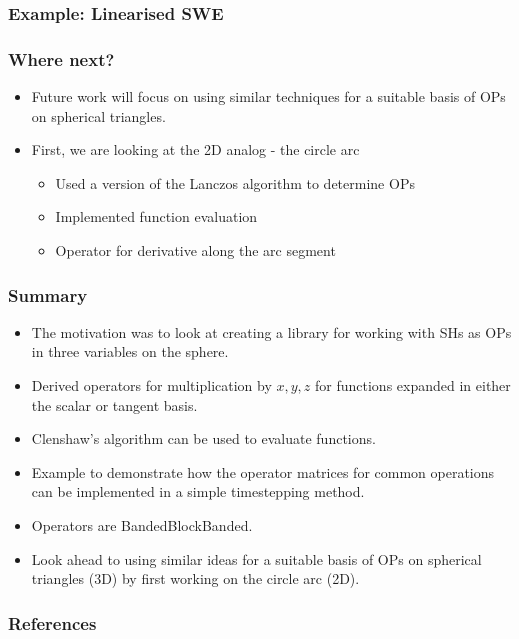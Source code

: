 \documentclass[10pt]{beamer}
\begin{document}
\frame
{
    \frametitle{Example: Linearised SWE}


}

\frame
{
    \frametitle{Where next?}

\begin{itemize}

\item Future work will focus on using similar techniques for a suitable basis of OPs on spherical triangles.

\item First, we are looking at the 2D analog - the circle arc

\begin{itemize}
	\item Used a version of the Lanczos algorithm to determine OPs
	\item Implemented function evaluation
	\item Operator for derivative along the arc segment
\end{itemize}

\end{itemize}
   
}

\frame
{
    \frametitle{Summary}

  \begin{itemize}
  
  \item The motivation was to look at creating a library for working with SHs as OPs in three variables on the sphere.
 
  \item Derived operators for multiplication by $x, y, z$ for functions expanded in either the scalar or tangent basis.
  
  \item Clenshaw's algorithm can be used to evaluate functions.
  
  \item Example to demonstrate how the operator matrices for common operations can be implemented in a simple timestepping method.
  
  \item Operators are BandedBlockBanded.
  
  \item Look ahead to using similar ideas for a suitable basis of OPs on spherical triangles (3D) by first working on the circle arc (2D).
  
  \end{itemize}
   
}










\frame
{
  \frametitle{References}

}
\end{document}
